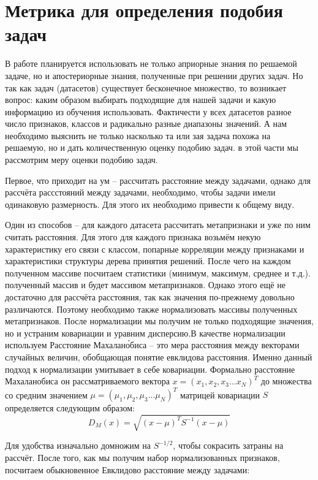 \documentclass[times,specification,annotation]{itmo-student-thesis}
\begin{document}
	\section{Метрика для определения подобия задач} \label{s:metrics}
	В работе планируется использовать не только априорные знания по решаемой задаче, но и апостериорные знания, полученные при решении других задач. Но так как задач (датасетов) существует бесконечное множество, то возникает вопрос: каким образом выбирать подходящие для нашей задачи и какую информацию из обучения использовать. Фактичести у всех датасетов разное число признаков, классов и радикально разные диапазоны значений. А нам необходимо выяснить не только насколько та или зая задача похожа на решаемую, но и дать количественную оценку подобию задач. в этой части мы рассмотрим меру оценки подобию задач. \par
	Первое, что приходит на ум -- рассчитать расстояние между задачами, однако для рассчёта рассстояний между задачами, необходимо, чтобы задачи имели одинаковую размерность. Для этого их необходимо привести к общему виду. \par 
	Один из способов -- для каждого датасета рассчитать метапризнаки и уже по ним считать расстояния. Для этого для каждого признака возьмём некую характеристику его связи с классом, попарные корреляции между признаками и характеристики структуры дерева принятия решений. После чего на каждом полученном массиве посчитаем статистики (минимум, максимум, среднее и т.д.). полученный массив и будет массивом метапризнаков. Однако этого ещё не достаточно для рассчёта расстояния, так как значения по-прежнему довольно различаются. Поэтому необходимо также нормализовать массивы полученных метапризнаков. После нормализации мы получим не только подходящие значения, но и устраним ковариации и уравним дисперсию.В качестве нормализации используем Расстояние Махалан\'обиса -- это мера расстояния между векторами случайных величин, обобщающая понятие евклидова расстояния. Именно данный подход к нормализации умитывает в себе ковариации. Формально расстояние Махаланобиса он рассматриваемого вектора $ x=(x_{1},x_{2},x_{3}...x_{N})^{T} $ до множества со средним значением $ \mu=(\mu_{1},\mu_{2},\mu_{3}...\mu_{N})^{T} $ матрицей ковариации $ S $ определяется следующим образом:
	\begin{equation}
	\mathit D_{M}(x)=\sqrt{(x-\mu)^{T}S^{-1}(x-\mu)}
	\label{eq:meh}
	\end{equation}\par
	Для удобства изначально домножим на $ S^{-1/2} $, чтобы сокрасить затраны на рассчёт. После того, как мы получим набор нормализованных признаков, посчитаем обыкновенное Евклидово расстояние между задачами:
\end{document}
